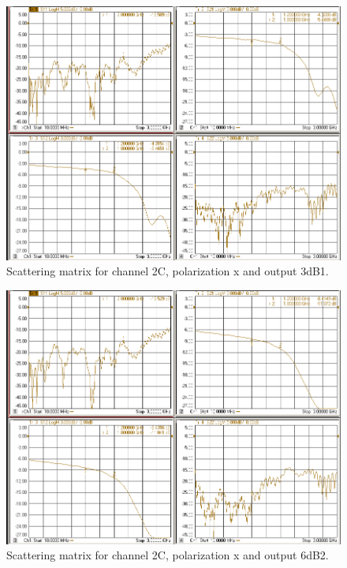 \documentclass[12pt,a4paper,oneside]{article}
\begin{document}
\begin{figure}[H]
\centering
\includegraphics[width=0.9\linewidth]{VNA_results/2Cx_3dB1.png}
\caption{Scattering matrix for channel 2C, polarization x and output 3dB1.}
\label{fig:2Cx_3dB1}
\end{figure}


\begin{figure}[H]
\centering
\includegraphics[width=0.9\linewidth]{VNA_results/2Cx_6dB2.png}
\caption{Scattering matrix for channel 2C, polarization x and output 6dB2.}
\label{fig:2Cx_6dB2}
\end{figure}
\end{document}

